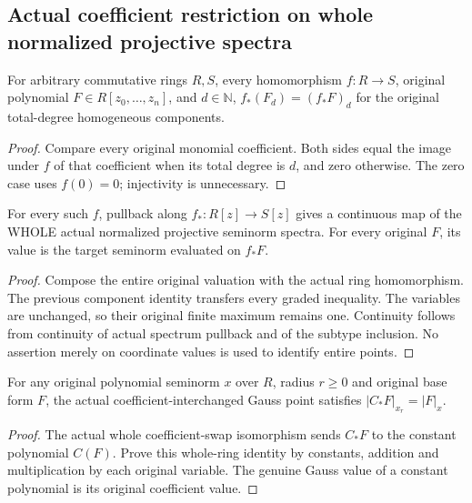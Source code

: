\subsection{Actual coefficient restriction on whole normalized projective spectra}

\begin{lemma}
\label{projective:actual-coefficient-homogeneous-components}
\leanok
For arbitrary commutative rings $R,S$, every homomorphism $f:R\to S$,
original polynomial $F\in R[z_0,\dots,z_n]$, and $d\in\mathbb N$,
$f_*(F_d)=(f_*F)_d$ for the original total-degree homogeneous components.
\end{lemma}
\begin{proof}
Compare every original monomial coefficient. Both sides equal the image
under $f$ of that coefficient when its total degree is $d$, and zero
otherwise. The zero case uses $f(0)=0$; injectivity is unnecessary.
\end{proof}

\begin{definition}
\label{projective:actual-normalized-coefficient-pullback}
\leanok
{}
For every such $f$, pullback along $f_*:R[z]\to S[z]$ gives a continuous
map of the WHOLE actual normalized projective seminorm spectra. For every
original $F$, its value is the target seminorm evaluated on $f_*F$.
\end{definition}
\begin{proof}
Compose the entire original valuation with the actual ring homomorphism.
The previous component identity transfers every graded inequality.
The variables are unchanged, so their original finite maximum remains
one. Continuity follows from continuity of actual spectrum pullback and
of the subtype inclusion. No assertion merely on coordinate values is
used to identify entire points.
\end{proof}

\begin{lemma}
\label{projective:actual-gauss-base-form-value}
\leanok
For any original polynomial seminorm $x$ over $R$, radius $r\ge0$ and
original base form $F$, the actual coefficient-interchanged Gauss point
satisfies $|C_*F|_{x_r}=|F|_x$.
\end{lemma}
\begin{proof}
The actual whole coefficient-swap isomorphism sends $C_*F$ to the constant
polynomial $C(F)$. Prove this whole-ring identity by constants, addition
and multiplication by each original variable. The genuine Gauss value
of a constant polynomial is its original coefficient value.
\end{proof}

